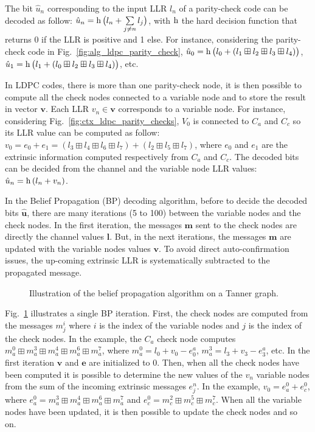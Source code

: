 The bit $\hat{u}_n$ corresponding to the input LLR $l_n$ of a parity-check code
can be decoded as follow: $\hat{u}_n = \operatorname{h}\big(l_n +
\sum\limits_{j \neq n}{l_j}\big)$, with $\operatorname{h}$ the hard decision function
that returns 0 if the LLR is positive and 1 else. For instance, considering the
parity-check code in Fig.~\ref{fig:alg_ldpc_parity_check}, $\hat{u}_0 =
\operatorname{h}\big(l_0 + (l_1 \boxplus l_2 \boxplus l_3 \boxplus l_4)\big)$,
$\hat{u}_1 = \operatorname{h}\big(l_1 + (l_0 \boxplus l_2 \boxplus l_3 \boxplus
l_4)\big)$, etc.

In LDPC codes, there is more than one parity-check node, it is then possible to
compute all the check nodes connected to a variable node and to store the result
in vector $\bm{v}$. Each LLR $v_n \in \bm{v}$ corresponds to a variable node.
For instance, considering Fig.~\ref{fig:ctx_ldpc_parity_checks}, $V_0$ is
connected to $C_a$ and $C_c$ so its LLR value can be computed as follow: $v_0
= e_0 + e_1 = (l_3 \boxplus l_4 \boxplus l_6 \boxplus l_7) + (l_2 \boxplus l_5
\boxplus l_7)$, where $e_0$ and $e_1$ are the extrinsic information computed
respectively from $C_a$ and $C_c$. The decoded bits can be decided from the
channel and the variable node LLR values: $\hat{u}_n = \operatorname{h}{(l_n + v_n)}$.

In the Belief Propagation (BP) decoding algorithm, before to decide the decoded
bits $\bm{\hat{u}}$, there are many iterations (5 to 100) between the variable
nodes and the check nodes. In the first iteration, the messages $\bm{m}$ sent to
the check nodes are directly the channel values $\bm{l}$. But, in the next
iterations, the messages $\bm{m}$ are updated with the variable nodes values
$\bm{v}$. To avoid direct auto-confirmation issues, the up-coming extrinsic LLR
is systematically subtracted to the propagated message.

\begin{figure}[htp]
  \centering
  \quad
  \caption{Illustration of the belief propagation algorithm on a Tanner graph.}
  \label{fig:alg_ldpc_bp}
\end{figure}

Fig.~\ref{fig:alg_ldpc_bp} illustrates a single BP iteration. First, the check
nodes are computed from the messages $m_j^i$ where $i$ is the index of the
variable nodes and $j$ is the index of the check nodes. In the example, the
$C_a$ check node computes $m^0_a \boxplus m^3_a \boxplus m^4_a \boxplus m^6_a
\boxplus m^7_a$, where $m^0_a = l_0 + v_0 - e^{a}_0$, $m^3_a = l_3 + v_3 -
e^{a}_3$, etc. In the first iteration $\bm{v}$ and $\bm{e}$ are initialized to
0. Then, when all the check nodes have been computed it is possible to
determine the new values of the $v_n$ variable nodes from the sum of the
incoming extrinsic messages $e_j^n$. In the example, $v_0 = e^0_a + e^0_c$,
where $e^0_a = m^3_a \boxplus m^4_a \boxplus m^6_a \boxplus m^7_a$ and $e^0_c =
m^2_c \boxplus m^5_c \boxplus m^7_c$. When all the variable nodes have been
updated, it is then possible to update the check nodes and so on.

